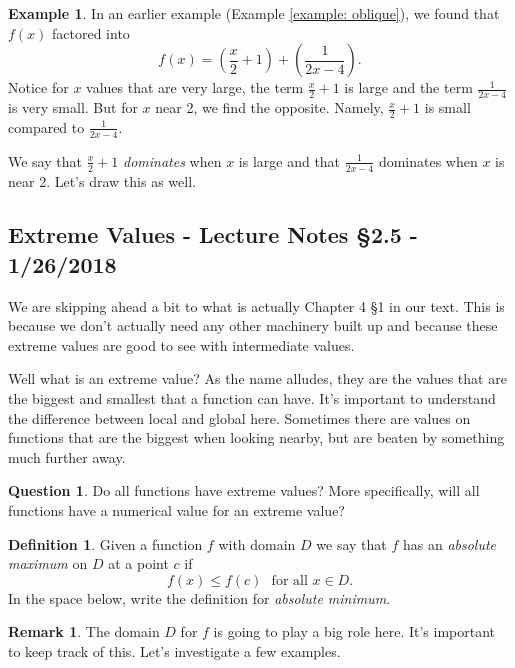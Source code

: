 \documentclass[leqno]{article}
\theoremstyle{definition}
\newtheorem{definition}{Definition}[section]
\newtheorem{remark}{Remark}[section]
\newtheorem{example}{Example}[section]
\newtheorem{question}{Question}[section]
\theoremstyle{remark}
\theoremstyle{theorem}
\begin{document}
\begin{example}
In an earlier example (Example \ref{example: oblique}), we found that $f(x)$ factored into
\[
f(x)=\left( \frac{x}{2} +1 \right) + \left( \frac{1}{2x-4} \right).
\]
Notice for $x$ values that are very large, the term $\frac{x}{2}+1$ is large and the term $\frac{1}{2x-4}$ is very small.  But for $x$ near 2, we find the opposite.  Namely, $\frac{x}{2}+1$ is small compared to $\frac{1}{2x-4}$. 

We say that $\frac{x}{2}+1$ \emph{dominates} when $x$ is large and that $\frac{1}{2x-4}$ dominates when $x$ is near 2. Let's draw this as well.
\vspace*{6cm}
\end{example}

\subsection{Extreme Values - Lecture Notes \S 2.5 - 1/26/2018}

We are skipping ahead a bit to what is actually Chapter 4 \S 1 in our text.  This is because we don't actually need any other machinery built up and because these extreme values are good to see with intermediate values.  

Well what is an extreme value?  As the name alludes, they are the values that are the biggest and smallest that a function can have.  It's important to understand the difference between local and global here.  Sometimes there are values on functions that are the biggest when looking nearby, but are beaten by something much further away.  

\begin{question}
Do all functions have extreme values? More specifically, will all functions have a numerical value for an extreme value?
\vspace*{4cm}
\end{question}

\begin{definition}
Given a function $f$ with domain $D$ we say that $f$ has an \emph{absolute maximum} on $D$ at a point $c$ if
\[
f(x)\leq f(c) ~~~ \textrm{for all $x \in D$}.
\]
In the space below, write the definition for \emph{absolute minimum}.
\vspace*{4cm}
\end{definition}

\begin{remark}
The domain $D$ for $f$ is going to play a big role here.  It's important to keep track of this.  Let's investigate a few examples.
\end{remark}
\end{document}
